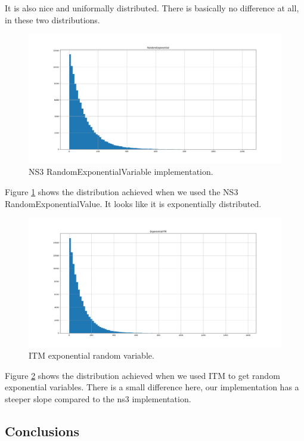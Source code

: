 \documentclass{article}
\begin{document}
  It is also nice and uniformally distributed. There is basically no difference at all, in these two distributions.
\newpage
  \begin{figure}[h!]
    \centering
      \includegraphics[width=\linewidth]{ns3exponential.png}
      \caption{NS3 RandomExponentialVariable implementation.}
      \label{fig:ns3rev}
  \end{figure}
  Figure \ref{fig:ns3rev} shows the distribution achieved when we used the NS3 RandomExponentialValue.
  It looks like it is exponentially distributed.
  \begin{figure}[h!]
    \centering
      \includegraphics[width=\linewidth]{exponentialITM.png}
      \caption{ITM exponential random variable.}
      \label{fig:itmrev}
  \end{figure}
  Figure \ref{fig:itmrev} shows the distribution achieved when we used ITM to get random exponential variables. 
  There is a small difference here, our implementation has a steeper slope compared to the ns3 implementation.
  \subsection{Conclusions}
\end{document}
